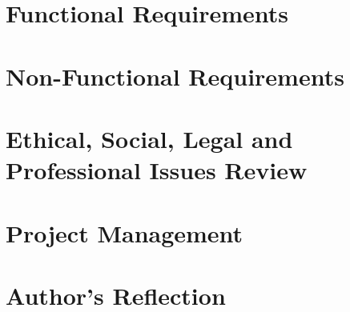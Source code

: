 \section{Functional Requirements}
\label{evaluation_functional_requirements}


\section{Non-Functional Requirements}
\label{evaluation_non_functional_requirements}


\section{Ethical, Social, Legal and Professional Issues Review}
\label{ethical_social_legal_and_professional_issues_review}


\section{Project Management}
\label{evaluation_project_management}


\section{Author's Reflection}
\label{authors_reflection}

